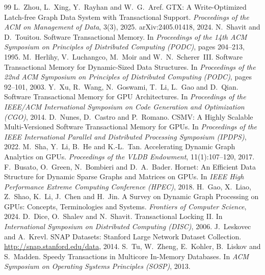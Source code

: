 \documentclass[11pt,a4paper,oneside]{report}
\begin{document}
\begin{singlespace}
\renewcommand{\bibname}{Bibliography}
\cleardoublepage{}
\begin{thebibliography}{99}
 L.~Zhou, L.~Xing, Y.~Rayhan and W.~G.~Aref. GTX: A Write-Optimized Latch-free Graph Data System with
  Transactional Support. \emph{Proceedings of the ACM on Management of Data}, 3(3), 2025. arXiv:2405.01418, 2024.
 N.~Shavit and D.~Touitou. Software Transactional Memory. In \emph{Proceedings of the 14th ACM Symposium on
  Principles of Distributed Computing (PODC)}, pages 204--213, 1995.
 M.~Herlihy, V.~Luchangco, M.~Moir and W.~N.~Scherer~III. Software Transactional Memory for
  Dynamic-Sized Data Structures. In \emph{Proceedings of the 22nd ACM Symposium on Principles of Distributed Computing
  (PODC)}, pages 92--101, 2003.
 Y.~Xu, R.~Wang, N.~Goswami, T.~Li, L.~Gao and D.~Qian. Software Transactional Memory for GPU
  Architectures. In \emph{Proceedings of the IEEE/ACM International Symposium on Code Generation and Optimization
  (CGO)}, 2014.
 D.~Nunes, D.~Castro and P.~Romano. CSMV: A Highly Scalable Multi-Versioned Software Transactional
  Memory for GPUs. In \emph{Proceedings of the IEEE International Parallel and Distributed Processing Symposium
  (IPDPS)}, 2022.
 M.~Sha, Y.~Li, B.~He and K.-L.~Tan. Accelerating Dynamic Graph Analytics on GPUs. \emph{Proceedings
  of the VLDB Endowment}, 11(1):107--120, 2017.
 F.~Busato, O.~Green, N.~Bombieri and D.~A.~Bader. Hornet: An Efficient Data Structure for Dynamic
  Sparse Graphs and Matrices on GPUs. In \emph{IEEE High Performance Extreme Computing Conference (HPEC)}, 2018.
 H.~Gao, X.~Liao, Z.~Shao, K.~Li, J.~Chen and H.~Jin. A Survey on Dynamic Graph Processing on GPUs:
  Concepts, Terminologies and Systems. \emph{Frontiers of Computer Science}, 2024.
 D.~Dice, O.~Shalev and N.~Shavit. Transactional Locking II. In \emph{International Symposium on
  Distributed Computing (DISC)}, 2006.
 J.~Leskovec and A.~Krevl. SNAP Datasets: Stanford Large Network Dataset Collection.
  \url{http://snap.stanford.edu/data}, 2014.
 S.~Tu, W.~Zheng, E.~Kohler, B.~Liskov and S.~Madden. Speedy Transactions in Multicore In-Memory
  Databases. In \emph{ACM Symposium on Operating Systems Principles (SOSP)}, 2013.
\end{thebibliography}
\end{singlespace}
\end{document}
